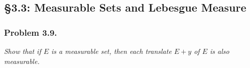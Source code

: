 \documentclass{article}
\begin{document}



\subsection*{\S 3.3: Measurable Sets and Lebesgue Measure \\}



\subsubsection*{Problem 3.9.}
\emph{Show that if $E$ is a measurable set, then each translate $E+y$ of $E$
is also measurable.} \\
\end{document}
